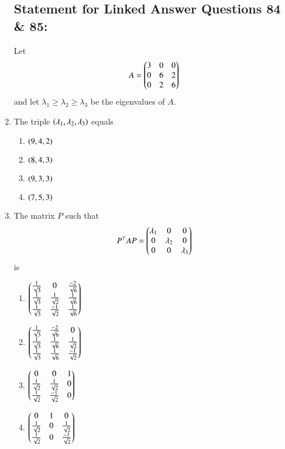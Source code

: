 \documentclass[journal]{IEEEtran}
\begin{document}
\begin{enumerate}
\subsection*{Statement for Linked Answer Questions 84 \& 85:}
Let 
\begin{align*}
    A = \begin{pmatrix}3 & 0 & 0\\0 & 6 & 2\\0 & 2 & 6\end{pmatrix}
\end{align*}
and let $\lambda_1\geq\lambda_2\geq\lambda_3$ be the eigenvalues  of $A$.
\item The triple $\left(\lambda_1, \lambda_2, \lambda_3\right)$ equals
\begin{multicols}{2}
    \begin{enumerate}
        \item $\left(9,4,2\right)$
        \item $\left(8,4,3\right)$
        \item $\left(9,3,3\right)$
        \item $\left(7,5,3\right)$
    \end{enumerate}
\end{multicols}
\item The matrix $P$ such that
\begin{align*}
    P^{\top}AP = \begin{pmatrix}\lambda_1 & 0 & 0\\0 & \lambda_2 & 0\\0 & 0 & \lambda_3\end{pmatrix}
\end{align*}
is
\begin{multicols}{2}
    \begin{enumerate}
        \item $\begin{pmatrix}\frac{1}{\sqrt{3}} & 0 & \frac{-2}{\sqrt{6}} \\ \frac{1}{\sqrt{3}} & \frac{1}{\sqrt{2}} & \frac{1}{\sqrt{6}} \\ \frac{1}{\sqrt{3}} & \frac{-1}{\sqrt{2}} & \frac{1}{\sqrt{6}}\end{pmatrix}$
        \item $\begin{pmatrix}\frac{1}{\sqrt{3}} & \frac{-2}{\sqrt{6}} & 0 \\ \frac{1}{\sqrt{3}} & \frac{1}{\sqrt{6}} & \frac{1}{\sqrt{2}} \\ \frac{1}{\sqrt{3}} & \frac{1}{\sqrt{6}} & \frac{-1}{\sqrt{2}}\end{pmatrix}$
        \item $\begin{pmatrix}0 & 0 & 1\\ \frac{1}{\sqrt{2}} & \frac{1}{\sqrt{2}} & 0 \\ \frac{1}{\sqrt{2}} & \frac{-1}{\sqrt{2}} & 0 \end{pmatrix}$
        \item $\begin{pmatrix}0 & 1 & 0\\ \frac{1}{\sqrt{2}} & 0 & \frac{1}{\sqrt{2}} \\ \frac{1}{\sqrt{2}} & 0 & \frac{-1}{\sqrt{2}}\end{pmatrix}$
    \end{enumerate}
\end{multicols}
\end{enumerate}
\end{document}
